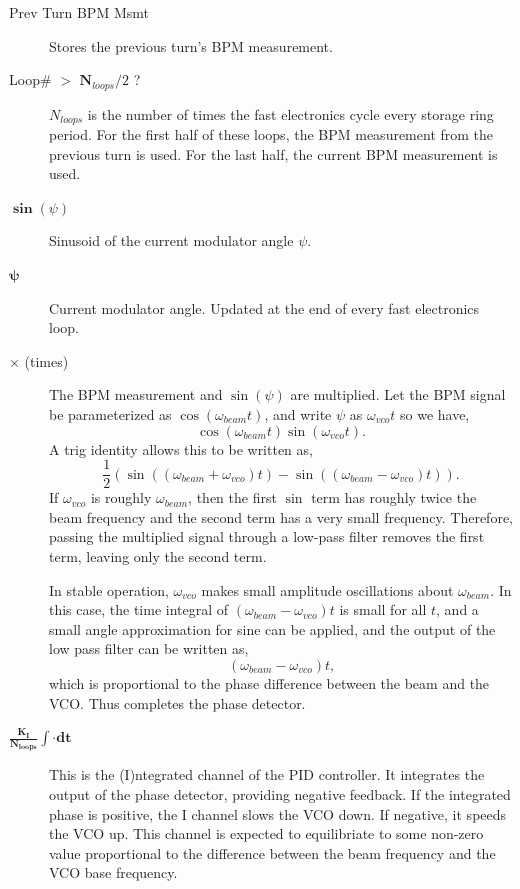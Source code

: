\begin{description}
\item[Prev Turn BPM Msmt]  Stores the previous turn's BPM measurement.

\item[Loop\# $\boldsymbol >$ $\boldsymbol N_{loops}/2$ ?]  
$N_{loops}$ is the number of times the fast electronics cycle every
storage ring period.  For the first half of these loops, the BPM
measurement from the previous turn is used.  For the last half, the
current BPM measurement is used.

\item[$\boldsymbol \sin\left(\psi\right)$]  
Sinusoid of the current modulator angle $\psi$.

\item[$\boldsymbol \psi$]  
Current modulator angle.  Updated at the end of every fast electronics loop.

\item[$\boldsymbol \times$ (times)]  
The BPM measurement and $\sin\left(\psi\right)$ are multiplied.  
Let the BPM signal be parameterized as $\cos\left(\omega_{beam}t\right)$, and 
write $\psi$ as $\omega_{vco}t$ so we have,
\begin{equation*}
\cos\left(\omega_{beam}t\right)\sin\left(\omega_{vco}t\right)\textrm{.}
\end{equation*}
A trig identity allows this to be written as,
\begin{equation*}
\frac{1}{2}\left(\sin\left(\left(\omega_{beam}+\omega_{vco}\right)t\right)-
\sin\left(\left(\omega_{beam}-\omega_{vco}\right)t\right)\right)\textrm{.}
\end{equation*}
If $\omega_{vco}$ is roughly $\omega_{beam}$, then the first $\sin$
term has roughly twice the beam frequency and the second term has a
very small frequency.  Therefore, passing the multiplied signal
through a low-pass filter removes the first term, leaving only the
second term.

In stable operation, $\omega_{vco}$ makes small amplitude oscillations
about $\omega_{beam}$.  In this case, the time integral of
$\left(\omega_{beam}-\omega_{vco}\right)t$ is small for all $t$, and a
small angle approximation for sine can be applied, and the output of
the low pass filter can be written as,
\begin{equation}
\left(\omega_{beam}-\omega_{vco}\right)t\textrm{,}
\end{equation}
which is proportional to the phase difference between the beam and the VCO.  Thus completes
the phase detector.

\item[$\boldsymbol{\frac{K_I}{N_{loops}}\int\cdot dt}$]  
This is the (I)ntegrated channel of the PID controller.  It integrates
the output of the phase detector, providing negative feedback.  If the
integrated phase is positive, the I channel slows the VCO down.  If
negative, it speeds the VCO up.  This channel is expected to
equilibriate to some non-zero value proportional to the difference
between the beam frequency and the VCO base frequency.


\end{description}
